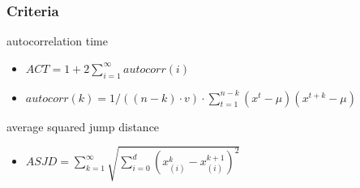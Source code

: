 \begin{frame}
\frametitle{Criteria}
\begin{block}{autocorrelation time}
\begin{itemize}
  \item $ACT = 1 + 2\sum_{i=1}^{\infty} autocorr(i)$
  \item $autocorr(k) = 1/((n-k)\cdot v)\cdot 
  \sum_{t=1}^{n-k}(x^t-\mu)(x^{t+k}-\mu)$
\end{itemize}

\end{block}
\begin{block}{average squared jump distance}
\begin{itemize}
  \item $ASJD = \sum_{k=1}^\infty \sqrt{\sum_{i=0}^d (x_{(i)}^k-x_{(i)}^{k+1})^2}$
\end{itemize}

\end{block}
\end{frame}